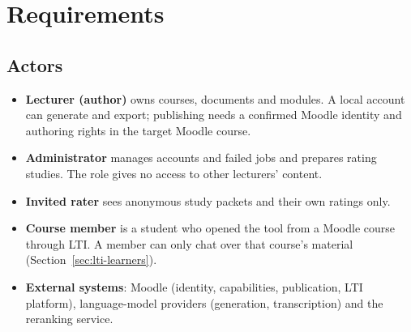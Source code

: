 \clearpage\section{Requirements}\label{sec:requirements}
\subsection{Actors}
\begin{itemize}[leftmargin=*,nosep]
\item \textbf{Lecturer (author)} owns courses, documents and modules. A local account can generate and export; publishing needs a confirmed Moodle identity and authoring rights in the target Moodle course.
\item \textbf{Administrator} manages accounts and failed jobs and prepares rating studies. The role gives no access to other lecturers' content.
\item \textbf{Invited rater} sees anonymous study packets and their own ratings only.
\item \textbf{Course member} is a student who opened the tool from a Moodle course through LTI. A member can only chat over that course's material (Section~\ref{sec:lti-learners}).
\item \textbf{External systems}: Moodle (identity, capabilities, publication, LTI platform), language-model providers (generation, transcription) and the reranking service.
\end{itemize}
